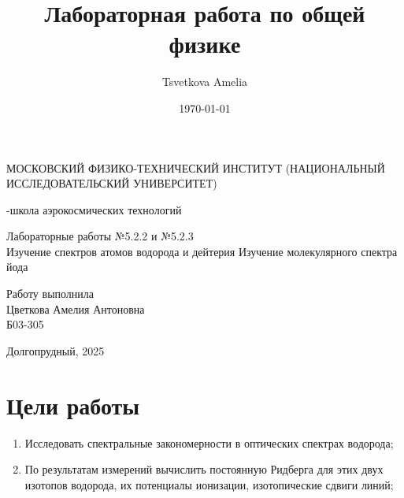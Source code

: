 \documentclass[a4paper,12pt]{article}
\author{Tsvetkova Amelia}
\title{Лабораторная работа по общей физике}
\date{\today}
\begin{document}
\begin{titlepage}
    \newpage
    \begin{center}
    {\large МОСКОВСКИЙ ФИЗИКО-ТЕХНИЧЕСКИЙ ИНСТИТУТ (НАЦИОНАЛЬНЫЙ ИССЛЕДОВАТЕЛЬСКИЙ УНИВЕРСИТЕТ)}
    \vspace{1cm}

    {-школа аэрокосмических технологий}
    \vspace{6em}
    \end{center}
    
    \vspace{1.2em}

    \begin{center}
    \Large Лабораторные работы №5.2.2 и №5.2.3 \\
    Изучение спектров атомов водорода и дейтерия
    Изучение молекулярного спектра йода
    \linebreak
    \end{center}
    
    \vspace{11em}
    
    \begin{flushright}
                       {\large Работу выполнила\\
                       Цветкова Амелия Антоновна\\
                       Б03-305 }
    \end{flushright}

    \vspace{\fill}

    \begin{center}
    Долгопрудный, 2025
    \end{center}

    \end{titlepage}

\section{Цели работы}
\begin{enumerate}
    \item Исследовать спектральные закономерности в оптических спектрах водорода;
    \item По результатам измерений вычислить постоянную Ридберга для этих двух изотопов водорода, их потенциалы ионизации, изотопические сдвиги линий;
\end{enumerate}
\end{document}
